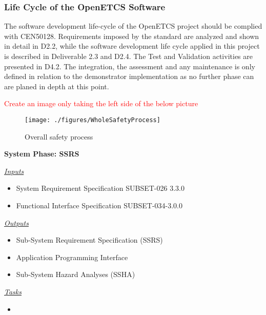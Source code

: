 \documentclass{template/openetcs_article}
\begin{document}
\subsubsection{Life Cycle of the OpenETCS Software}
The software development life-cycle of the OpenETCS project should be complied with CEN50128. Requirements imposed by the standard are analyzed and shown in detail in D2.2, while the software development life cycle applied in this project is described in Deliverable 2.3 and D2.4. The Test and Validation activities are presented in D4.2. The integration, the assessment and any maintenance is only defined in relation to the demonstrator implementation as no further phase can are planed in depth at this point.

\textcolor{red}{Create an image only taking the left side of the below picture}
\begin{figure}[H]
\centering
\texttt{[image: ./figures/WholeSafetyProcess]}
\caption[Overall safety process]{Overall safety process}
\label{fig:SafetyProcess}
\end{figure}


\begin{description}
\item \textbf{System Phase: SSRS}

\underline{\textit{Inputs}}
\begin{itemize}
\item System Requirement Specification SUBSET-026 3.3.0
\item Functional Interface Specification SUBSET-034-3.0.0
\end{itemize}


\underline{\textit{Outputs}}
\begin{itemize}
\item Sub-System Requirement Specification
(SSRS)
\item Application Programming Interface
\item Sub-System Hazard Analyses (SSHA)
\end{itemize}

\underline{\textit{Tasks}}
\begin{itemize}
\item 
\end{itemize}
\end{description}
\end{document}
